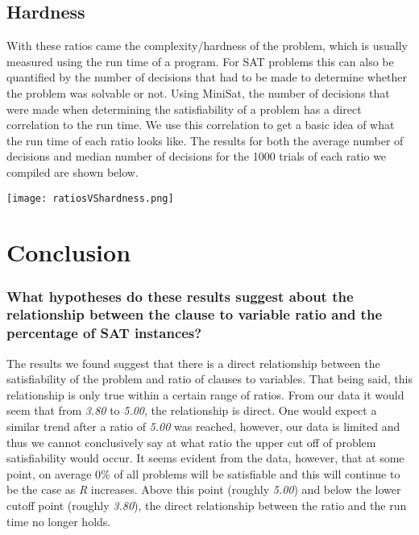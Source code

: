 \documentclass{eptcs}
\begin{document}
\subsection{Hardness}
With these ratios came the complexity/hardness of the problem, which is usually measured using the run time of a program. For SAT problems this can also be quantified by the number of decisions that had to be made to determine whether the problem was solvable or not. Using MiniSat, the number of decisions that were made when determining the satisfiability of a problem has a direct correlation to the run time. We use this correlation to get a basic idea of what the run time of each ratio looks like. The results for both the average number of decisions and median number of decisions for the 1000 trials of each ratio we compiled are shown below.
\begin{center}
	\texttt{[image: ratiosVShardness.png]}
\end{center}
\section*{Conclusion}

\subsubsection{What hypotheses do these results suggest about the relationship between the clause to variable ratio and the percentage of SAT instances?}
The results we found suggest that there is a direct relationship between the satisfiability of the problem and ratio of clauses to variables. That being said, this relationship is only true within a certain range of ratios. From our data it would seem that from \textit{3.80} to \textit{5.00}, the relationship is direct. One would expect a similar trend after a ratio of \textit{5.00} was reached, however, our data is limited and thus we cannot conclusively say at what ratio the upper cut off of problem satisfiability would occur. It seems evident from the data, however, that at some point, on average 0\% of all problems will be satisfiable and this will continue to be the case as \textit{R} increases. Above this point (roughly \textit{5.00}) and below the lower cutoff point (roughly \textit{3.80}), the direct relationship between the ratio and the run time no longer holds.
\end{document}
